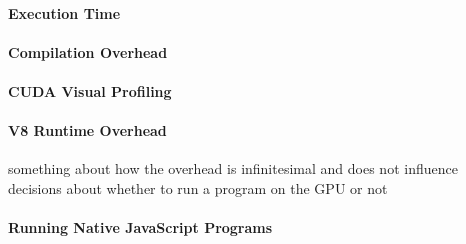 \paragraph{Execution Time}
\paragraph{Compilation Overhead}
\paragraph{CUDA Visual Profiling}
\paragraph{V8 Runtime Overhead}
something about how the overhead is infinitesimal and does not influence
decisions about whether to run a program on the GPU or not
\paragraph{Running Native JavaScript Programs}


